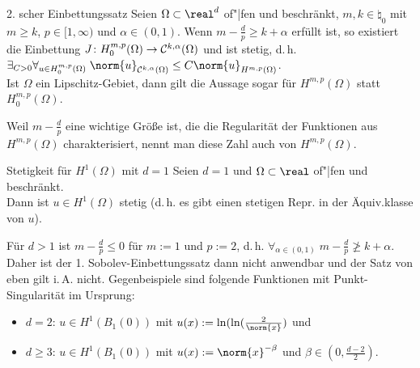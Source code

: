 \begin{Satz}{2. scher Einbettungssatz}
    Seien $\Omega \subset \real^d$ of"|fen und beschränkt,
    $m, k \in \natural_0$ mit $m \ge k$,
    $p \in [1, \infty)$ und
    $\alpha \in (0, 1)$.
    Wenn $m - \frac{d}{p} \ge k + \alpha$ erfüllt ist,
    so existiert die Einbettung $J\colon H_0^{m,p}(\Omega) \to \mathcal{C}^{k,\alpha}(\Omega)$
    und ist stetig,
    d.\,h. $\exists_{C > 0} \forall_{u \in H_0^{m,p}(\Omega)}\;
    \norm{u}_{\C^{k,\alpha}(\Omega)} \le C \norm{u}_{H^{m,p}(\Omega)}$.\\
    Ist $\Omega$ ein Lipschitz-Gebiet, dann gilt die Aussage sogar für
    $H^{m,p}(\Omega)$ statt $H_0^{m,p}(\Omega)$.
\end{Satz}

\begin{Bem}
    Weil $m - \frac{d}{p}$ eine wichtige Größe ist, die die Regularität der
    Funktionen aus $H^{m,p}(\Omega)$ charakterisiert,
    nennt man diese Zahl auch  von $H^{m,p}(\Omega)$.
\end{Bem}

\linie

\begin{Satz}{Stetigkeit für $H^1(\Omega)$ mit $d = 1$}
    Seien $d = 1$ und $\Omega \subset \real$ of"|fen und beschränkt.\\
    Dann ist $u \in H^1(\Omega)$ stetig
    (d.\,h. es gibt einen stetigen Repr. in der Äquiv.klasse von $u$).
\end{Satz}

\begin{Bem}
    Für $d > 1$ ist $m - \frac{d}{p} \le 0$ für $m := 1$ und $p := 2$,
    d.\,h. $\forall_{\alpha \in (0, 1)}\; m - \frac{d}{p} \not\ge k + \alpha$.\\
    Daher ist der 1. Sobolev-Einbettungssatz dann nicht anwendbar und der Satz von eben
    gilt i.\,A. nicht.
    Gegenbeispiele sind folgende Funktionen mit Punkt-Singularität im Ursprung:
    \begin{itemize}
        \item
        $d = 2$:
        $u \in H^1(B_1(0))$ mit
        $u(x) := \ln(\ln(\frac{2}{\norm{x}})$ und

        \item
        $d \ge 3$:
        $u \in H^1(B_1(0))$ mit
        $u(x) := \norm{x}^{-\beta}$ und $\beta \in (0, \frac{d-2}{2})$.
    \end{itemize}
\end{Bem}

